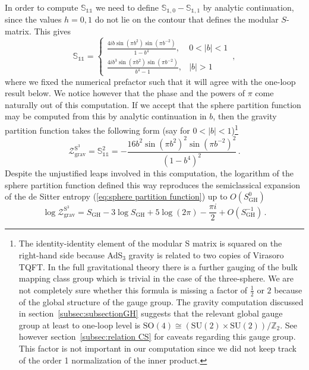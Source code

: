 \documentclass[12pt,a4paper]{article}
\newcommand\SU{\text{SU}}
\newcommand\SO{\text{SO}}
\newcommand\ZZ{\mathbb{Z}}
\newcommand{\id}{\mathds{1}}
\begin{document}
In order to compute $\mathbb{S}_{\id\id}$ we need to define $\mathbb{S}_{\id,0}-\mathbb{S}_{\id,1}$ by analytic continuation, since the values $h=0,1$ do not lie on the contour that defines the modular $S$-matrix. This gives 
\begin{equation}
    \mathbb{S}_{\id\id} = \begin{cases}
    \frac{4ib\sin(\pi b^2)\sin(\pi b^{-2})}{1-b^4}, & 0<|b|<1 \\ 
    \frac{4i b^3\sin(\pi b^2)\sin(\pi b^{-2})}{b^4-1}, & |b|>1
    \end{cases}\, ,
\end{equation}
where we fixed the numerical prefactor such that it will agree with the one-loop result below. We notice however that the phase and the powers of $\pi$ come naturally out of this computation.
If we accept that the sphere partition function may be computed from this by analytic continuation in $b$, then the gravity partition function takes the following form (say for $0<|b|<1$)\footnote{The identity-identity element of the modular S matrix is squared on the right-hand side because AdS$_3$ gravity is related to two copies of Virasoro TQFT. In the full gravitational theory there is a further gauging of the bulk mapping class group which is trivial in the case of the three-sphere. We are not completely sure whether this formula is missing a factor of $\frac{1}{2}$ or $2$ because of the global structure of the gauge group. The gravity computation discussed in section~\ref{subsec:subsectionGH} suggests that the relevant global gauge group at least to one-loop level is $\SO(4) \cong (\SU(2) \times \SU(2))/\ZZ_2$. See however section~\ref{subsec:relation CS} for caveats regarding this gauge group. This factor is not important in our computation since we did not keep track of the order 1 normalization of the inner product.} 
\begin{equation}
    \mathcal{Z}_{\text{grav}}^{\text{S}^3} = \mathbb{S}_{\id\id}^2 = -\frac{16 b^2 \sin(\pi b^2)^2\sin(\pi b^{-2})^2}{(1-b^4)^2}\, . \label{eq:conjecture ZS3}
\end{equation}
Despite the unjustified leaps involved in this computation, the logarithm of the sphere partition function defined this way reproduces the semiclassical expansion of the de Sitter entropy (\ref{eq:sphere partition function}) up to $O(S_\text{GH}^0)$ 
\begin{equation}
    \log\mathcal{Z}_{\text{grav}}^{\text{S}^3} = S_{\text{GH}} - 3\log S_{\text{GH}} +5\log(2\pi) - \frac{\pi i}{2} + O(S_{\text{GH}}^{-1})\, .
\end{equation}
\end{document}
